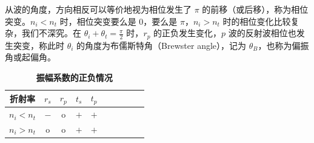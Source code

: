 \documentclass[UTF8]{report}
\theoremstyle{MyLineTheoremStyle} %
\theoremstyle{MyBlockTheoremStyle} %
\theoremstyle{MySubsubsectionStyle} %
\begin{document}
\begin{center}\noindent\begin{minipage}{0.65\columnwidth}
    \hspace*{2em} 从波的角度，方向相反可以等价地视为相位发生了 $\pi$ 的前移（或后移），称为相位突变。$n_i < n_t$ 时，相位突变要么是 0，要么是 $\pi$，$n_i > n_t$ 时的相位变化比较复杂，我们不深究。在 $\theta_i + \theta_t = \frac{\pi}{2}$ 时，$r_p$ 的正负发生变化，$p$ 波的反射波相位也发生突变，称此时 $\theta_i$ 的角度为布儒斯特角（Brewster angle），记为 $\theta_B$，也称为偏振角或起偏角。
\end{minipage}\hfill\begin{minipage}{0.3\columnwidth}
    \begin{table}[H]\centering
            \caption{\textbf{振幅系数的正负情况}}
            \label{振幅系数的正负情况}
        \begin{tabular}{cccccccccc}\toprule
            折射率 & $r_s$& $r_p$ & $t_s$ & $t_p$\\
            \midrule                        
            $n_i < n_t$ & $-$ & o & $+$ & $+$\\
            $n_i > n_t$ & o & o & $+$ & $+$\\
            \bottomrule
        \end{tabular}
    \end{table}
\end{minipage}\end{center}
\end{document}
